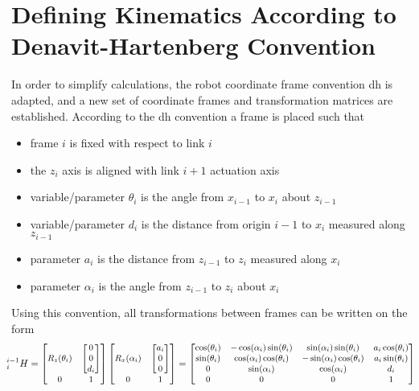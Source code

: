 

\section{Defining Kinematics According to Denavit-Hartenberg Convention}

In order to simplify calculations, the robot coordinate frame convention \gls{dh} is adapted, and a new set of coordinate frames and transformation matrices are established. According to the \gls{dh} convention a frame is placed such that
\begin{itemize}
\itemsep-1.3mm 
\item frame $i$ is fixed with respect to link $i$
\item the $z_i$ axis is aligned with link $i+1$ actuation axis
\item variable/parameter $\theta_i$ is the angle from $x_{i-1}$ to $x_i$ about $z_{i-1}$
\item variable/parameter $d_i$ is the distance from origin $i-1$ to $x_i$ measured along $z_{i-1}$
\item parameter $a_i$ is the distance from $z_{i-1}$ to $z_i$ measured along $x_i$
\item parameter $\alpha_i$ is the angle from $z_{i-1}$ to $z_i$ about $x_i$
\end{itemize}

Using this convention, all transformations between frames can be written on the form
\begin{equation}
\hspace*{-2mm}
\small
^{i-1}_i H = %
\begin{bmatrix}
R_z(\theta_i) & \begin{bmatrix}0\\ 0\\ d_i\end{bmatrix}\\
0 & 1
\end{bmatrix}
\begin{bmatrix}
R_x(\alpha_i) & \begin{bmatrix}a_i\\ 0\\ 0\end{bmatrix}\\
0 & 1
\end{bmatrix}
=
\begin{bmatrix}
\cos(\theta_i) & -\cos(\alpha_i)\sin(\theta_i) & \sin(\alpha_i)\sin(\theta_i) & a_i \cos(\theta_i)\\
\sin(\theta_i) & \cos(\alpha_i)\cos(\theta_i) & -\sin(\alpha_i)\cos(\theta_i) & a_i \sin(\theta_i)\\
0 & \sin(\alpha_i) & \cos(\alpha_i) & d_i\\
0 & 0 & 0 & 1
\end{bmatrix}
\end{equation}

